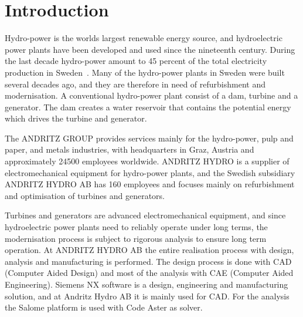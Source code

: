 
\section{Introduction}

Hydro-power is the worlds largest renewable energy source, and hydroelectric power plants have been developed and used since the nineteenth century. During the last decade hydro-power amount to 45 percent of the total electricity production in Sweden~\cite{scb}. Many of the hydro-power plants in Sweden were built several decades ago, and they are therefore in need of refurbishment and modernisation. A conventional hydro-power plant consist of a dam, turbine and a generator. The dam creates a water reservoir that contains the potential energy which drives the turbine and generator.

The ANDRITZ GROUP provides services mainly for the hydro-power, pulp and paper, and metals industries, with headquarters in Graz, Austria and approximately \num{24500} employees worldwide. ANDRITZ HYDRO is a supplier of electromechanical equipment for hydro-power plants, and the Swedish subsidiary ANDRITZ HYDRO AB has 160 employees and focuses mainly on refurbishment and optimisation of turbines and generators.

Turbines and generators are advanced electromechanical equipment, and since hydroelectric power plants need to reliably operate under long terms, the modernisation process is subject to rigorous analysis to ensure long term operation. At ANDRITZ HYDRO AB the entire realisation process with design, analysis and manufacturing is performed. The design process is done with CAD (Computer Aided Design) and most of the analysis with CAE (Computer Aided Engineering). Siemens NX software is a design, engineering and manufacturing solution, and at Andritz Hydro AB it is mainly used for CAD. For the analysis the Salome platform is used with Code Aster as solver.


